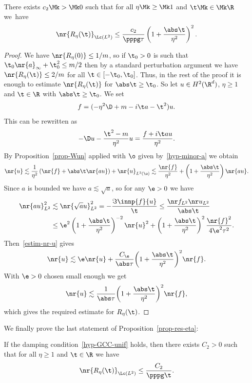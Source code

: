 \begin{prop}\label{prop-estim-Reta}
There exists $c_2 \Mk>\Mk 0$ such that for all $\eta \Mk\geq\Mk 1$ and $\t \Mk\in\Mk \R$ we~have
\[
\nr{R_\eta(\t)}_{\Lc(L^2)} \leq \frac {c_2}{\pppg \tau} \left(1 + \frac {\abs \t}{\eta^2} \right)^2.
\]
\end{prop}

\begin{proof}
We have $\nr{R_\eta(0)} \leq 1/m$, so if $\t_0 > 0$ is such that $\t_0 \nr{a}_\infty + \t_0^2 \leq m/2$ then by a standard perturbation argument we have $\nr{R_\eta(\t)} \leq 2/m$ for all $\t \in [-\t_0,\t_0]$. Thus, in the rest of the proof it is enough to estimate $\nr{R_\eta(\t)}$ for $\abs \t \geq \t_0$. So let $u \in H^2(\R^d)$, $\eta \geq 1$ and $\t \in \R$ with $\abs \t \geq \t_0$. We set
\begin{equation*}
f = (-\eta^2 \D + m - i \t a - \t^2) u.
\end{equation*}
This can be rewritten as
\[
-\D u - \frac {\t^2-m} {\eta^2} u = \frac{f + i\t a u}{\eta^2}.
\]
By Proposition~\ref{prop-Wun} applied with $\o$ given by~\eqref{hyp-minor-a} we obtain
\begin{equation}\label{estim-nr-u}
\nr{u} \lesssim \frac 1 {\eta^2} \left(\nr{f} + \abs \t \nr{au} \right) + \nr{u}_{L^2(\o)} \lesssim \frac {\nr{f}}{\eta^2} + \left(1+\frac {\abs \t}{\eta^2} \right) \nr{a u}.
\end{equation}
Since $a$ is bounded we have $a \lesssim \sqrt a$, so for any $\e > 0$ we have
\begin{align*}
\nr{a u}_{L^2}^2 & \lesssim \nr{\sqrt a u}_{L^2}^2 = - \frac {\Im \innp{f}{u}}{\t} \leq \frac {\nr f_{L^2} \nr u_{L^2}} {\abs \t}\\
& \leq \e^2 \left(1 + \frac {\abs \t}{\eta^2} \right)^{-2} \nr{u}^2 + \left(1 + \frac {\abs \t}{\eta^2} \right)^2 \frac {\nr{f}^2}{4\e^2 \tau^2}.
\end{align*}
Then~\eqref{estim-nr-u} gives
\[
\nr{u} \lesssim \e \nr{u} + \frac {C_\e}{\abs \tau} \smash{\left(1 + \frac {\abs \t}{\eta^2} \right)^2} \nr{f}.
\]
With $\e > 0$ chosen small enough we get
\[
\nr{u} \lesssim \frac {1}{\abs \tau} {\left(1 + \frac {\abs \t}{\eta^2} \right)^2}\nr{f},
\]
which gives the required estimate for $R_\eta(\t)$.
\end{proof}


We finally prove the last statement of Proposition~\ref{prop-res-eta}:

\begin{prop}\label{prop-estim-Reta-GCC}
If the damping condition~\eqref{hyp-GCC-unif} holds, then there exists $C_2 > 0$ such that for all $\eta \geq 1$ and $\t \in \R$ we have
\[
\nr{R_\eta(\t)}_{\Lc(L^2)} \leq \frac {C_2} {\pppg \t}.
\]
\end{prop}


